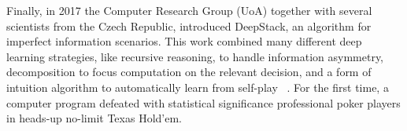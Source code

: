 Finally, in 2017 the Computer Research Group (UoA) together with several scientists from the Czech Republic, introduced DeepStack, an algorithm for imperfect information scenarios. This work combined many different deep learning strategies, like recursive reasoning, to handle information asymmetry, decomposition to focus computation on the relevant decision, and a form of intuition algorithm to automatically learn from self-play ~\cite{Moravcik2017}. For the first time, a computer program defeated with statistical significance professional poker players in heads-up no-limit Texas Hold’em.

